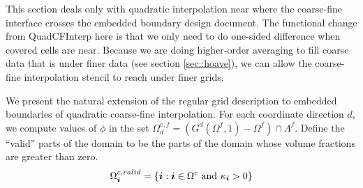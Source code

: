This section deals only with quadratic interpolation near where the
coarse-fine interface crosses the embedded boundary
design document.   The functional change from QuadCFInterp here is that we only
need to do one-sided difference when covered cells are near.   Because
we are doing higher-order averaging to fill coarse data that is under
finer data (see section \ref{sec::hoave}), 
we can allow the coarse-fine interpolation stencil to
reach under finer grids.

We present the natural extension of the regular grid description to
embedded boundaries of quadratic coarse-fine interpolation.   For each
coordinate direction $d$, we compute values of $\phi$ in the set 
$\Omega^{e,f}_d = (G^d(\Omega^f, 1) - \Omega^f) \cap \Lambda^f$.
Define the ``valid'' parts of the domain to be the parts of the domain
whose volume fractions are greater than zero.
$$
\Omega^{c,valid}_{\boldsymbol{i}} = \{ {\boldsymbol{i}}: {\boldsymbol{i}} \in \Omega^c \mbox{ and } \kappa_{\boldsymbol{i}} > 0 \}
$$

